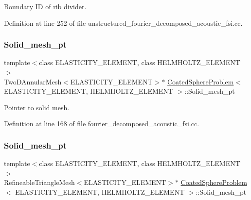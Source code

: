 Boundary ID of rib divider. 



Definition at line 252 of file unstructured\+\_\+fourier\+\_\+decomposed\+\_\+acoustic\+\_\+fsi.\+cc.

\mbox{\label{classCoatedSphereProblem_a4bba1d667061b296208039207bd3347d}} 
\subsubsection{\texorpdfstring{Solid\+\_\+mesh\+\_\+pt}{Solid\_mesh\_pt}\hspace{0.1cm}{\footnotesize\ttfamily [1/3]}}
{\footnotesize\ttfamily template$<$class E\+L\+A\+S\+T\+I\+C\+I\+T\+Y\+\_\+\+E\+L\+E\+M\+E\+NT, class H\+E\+L\+M\+H\+O\+L\+T\+Z\+\_\+\+E\+L\+E\+M\+E\+NT$>$ \\
Two\+D\+Annular\+Mesh$<$E\+L\+A\+S\+T\+I\+C\+I\+T\+Y\+\_\+\+E\+L\+E\+M\+E\+NT$>$$\ast$ \hyperlink{classCoatedSphereProblem}{Coated\+Sphere\+Problem}$<$ E\+L\+A\+S\+T\+I\+C\+I\+T\+Y\+\_\+\+E\+L\+E\+M\+E\+NT, H\+E\+L\+M\+H\+O\+L\+T\+Z\+\_\+\+E\+L\+E\+M\+E\+NT $>$\+::Solid\+\_\+mesh\+\_\+pt\hspace{0.3cm}{\ttfamily [private]}}



Pointer to solid mesh. 



Definition at line 168 of file fourier\+\_\+decomposed\+\_\+acoustic\+\_\+fsi.\+cc.

\mbox{\label{classCoatedSphereProblem_a0239a4320d1a34e632a81599d908b648}} 
\subsubsection{\texorpdfstring{Solid\+\_\+mesh\+\_\+pt}{Solid\_mesh\_pt}\hspace{0.1cm}{\footnotesize\ttfamily [2/3]}}
{\footnotesize\ttfamily template$<$class E\+L\+A\+S\+T\+I\+C\+I\+T\+Y\+\_\+\+E\+L\+E\+M\+E\+NT, class H\+E\+L\+M\+H\+O\+L\+T\+Z\+\_\+\+E\+L\+E\+M\+E\+NT$>$ \\
Refineable\+Triangle\+Mesh$<$E\+L\+A\+S\+T\+I\+C\+I\+T\+Y\+\_\+\+E\+L\+E\+M\+E\+NT$>$$\ast$ \hyperlink{classCoatedSphereProblem}{Coated\+Sphere\+Problem}$<$ E\+L\+A\+S\+T\+I\+C\+I\+T\+Y\+\_\+\+E\+L\+E\+M\+E\+NT, H\+E\+L\+M\+H\+O\+L\+T\+Z\+\_\+\+E\+L\+E\+M\+E\+NT $>$\+::Solid\+\_\+mesh\+\_\+pt\hspace{0.3cm}{\ttfamily [private]}}



